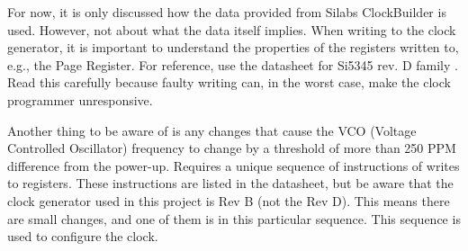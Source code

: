 
\noindent For now, it is only discussed how the data provided from Silabs ClockBuilder is used. However, not about what the data itself implies.
When writing to the clock generator, it is important to understand the properties of the registers written to, e.g., the Page Register. For reference, use the datasheet for Si5345 rev. D family \cite{Si5345Si17:online}. Read this carefully because faulty writing can, in the worst case, make the clock programmer unresponsive. 

Another thing to be aware of is any changes that cause the VCO (Voltage Controlled Oscillator) frequency to change by a threshold of more than 250 PPM difference from the power-up. Requires a unique sequence of instructions of writes to registers. 
These instructions are listed in the datasheet, but be aware that the clock generator used in this project is Rev B  (not the Rev D). This means there are small changes, and one of them is in this particular sequence. This sequence is used to configure the clock. 

